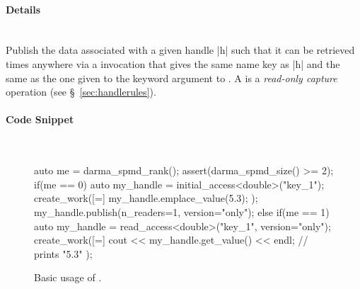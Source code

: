 \paragraph{Details} \mbox{}\\
Publish the data associated with a given \gls{handle} |h| such that it can be
retrieved  times anywhere via a  invocation
that gives the same name key as |h| and the same 
 as the one given to the \gls{keyword argument} to .
A  is a {\it read-only capture} operation (see
\S~\ref{sec:handlerules}).

\paragraph{Code Snippet} \mbox{}\\
\begin{figure}[!h]
\begin{CppCodeNumb}
auto me = darma_spmd_rank();
assert(darma_spmd_size() >= 2);
if(me == 0) {
  auto my_handle = initial_access<double>("key_1");
  create_work([=]{
    my_handle.emplace_value(5.3);
  });
  my_handle.publish(n_readers=1, version="only");
}
else if(me == 1) {
  auto my_handle = read_access<double>("key_1", version="only");
  create_work([=]{
    cout << my_handle.get_value() << endl; // prints "5.3"
  });
}
\end{CppCodeNumb}
\label{fig:fe_api_publish}
\caption{Basic usage of \protect{}.}
\end{figure}

